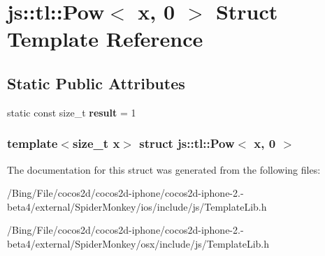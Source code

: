 \hypertarget{structjs_1_1tl_1_1_pow_3_01x_00_010_01_4}{\section{js\-:\-:tl\-:\-:Pow$<$ x, 0 $>$ Struct Template Reference}
\label{structjs_1_1tl_1_1_pow_3_01x_00_010_01_4}
}
\subsection*{Static Public Attributes}
\begin{DoxyCompactItemize}
\item 
\hypertarget{structjs_1_1tl_1_1_pow_3_01x_00_010_01_4_aa80c1c9b2c3bda42b4588e38456f8876}{static const size\-\_\-t {\bfseries result} = 1}\label{structjs_1_1tl_1_1_pow_3_01x_00_010_01_4_aa80c1c9b2c3bda42b4588e38456f8876}

\end{DoxyCompactItemize}
\subsubsection*{template$<$size\-\_\-t x$>$ struct js\-::tl\-::\-Pow$<$ x, 0 $>$}



The documentation for this struct was generated from the following files\-:\begin{DoxyCompactItemize}
\item 
/\-Bing/\-File/cocos2d/cocos2d-\/iphone/cocos2d-\/iphone-\/2.-\/beta4/external/\-Spider\-Monkey/ios/include/js/Template\-Lib.\-h\item 
/\-Bing/\-File/cocos2d/cocos2d-\/iphone/cocos2d-\/iphone-\/2.-\/beta4/external/\-Spider\-Monkey/osx/include/js/Template\-Lib.\-h\end{DoxyCompactItemize}
